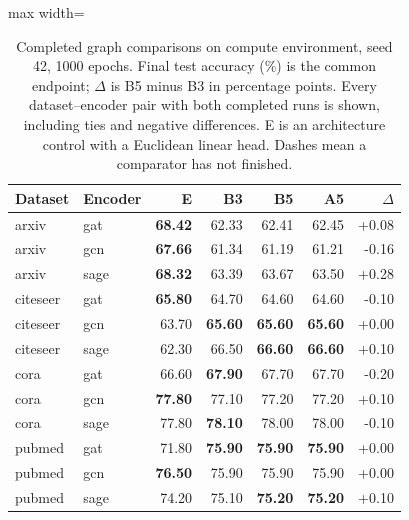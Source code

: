 \begin{table}[t]
\centering
\footnotesize\setlength{\tabcolsep}{4.2pt}\renewcommand{\arraystretch}{1.12}
\caption{Completed graph comparisons on compute environment, seed 42, 1000 epochs. Final test accuracy (\%) is the common endpoint; $\Delta$ is B5 minus B3 in percentage points. Every dataset--encoder pair with both completed runs is shown, including ties and negative differences. E is an architecture control with a Euclidean linear head. Dashes mean a comparator has not finished.}
\label{tab:revision-breadth}
\begin{adjustbox}{max width=\linewidth}
\begin{tabular}{llrrrrr}
\toprule
Dataset & Encoder & E & B3 & B5 & A5 & $\Delta$ \\
\midrule
arxiv & gat & \textbf{68.42} & 62.33 & \cellcolor{oursbg}62.41 & 62.45 & +0.08 \\
arxiv & gcn & \textbf{67.66} & 61.34 & \cellcolor{oursbg}61.19 & 61.21 & -0.16 \\
arxiv & sage & \textbf{68.32} & 63.39 & \cellcolor{oursbg}63.67 & 63.50 & +0.28 \\
citeseer & gat & \textbf{65.80} & 64.70 & \cellcolor{oursbg}64.60 & 64.60 & -0.10 \\
citeseer & gcn & 63.70 & \textbf{65.60} & \cellcolor{oursbg}\textbf{65.60} & \textbf{65.60} & +0.00 \\
citeseer & sage & 62.30 & 66.50 & \cellcolor{oursbg}\textbf{66.60} & \textbf{66.60} & +0.10 \\
cora & gat & 66.60 & \textbf{67.90} & \cellcolor{oursbg}67.70 & 67.70 & -0.20 \\
cora & gcn & \textbf{77.80} & 77.10 & \cellcolor{oursbg}77.20 & 77.20 & +0.10 \\
cora & sage & 77.80 & \textbf{78.10} & \cellcolor{oursbg}78.00 & 78.00 & -0.10 \\
pubmed & gat & 71.80 & \textbf{75.90} & \cellcolor{oursbg}\textbf{75.90} & \textbf{75.90} & +0.00 \\
pubmed & gcn & \textbf{76.50} & 75.90 & \cellcolor{oursbg}75.90 & 75.90 & +0.00 \\
pubmed & sage & 74.20 & 75.10 & \cellcolor{oursbg}\textbf{75.20} & \textbf{75.20} & +0.10 \\
\bottomrule
\end{tabular}
\end{adjustbox}
\end{table}

